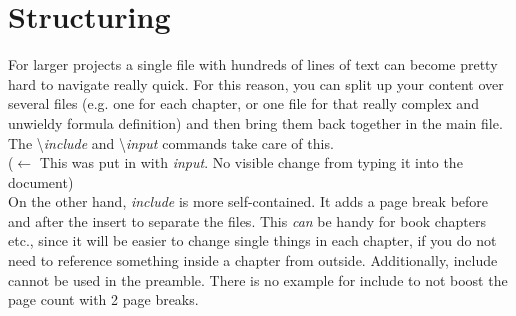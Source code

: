 \section{Structuring}
For larger projects a single file with hundreds of lines of text can become pretty hard to navigate really quick. For this reason, you can split up your content over several files (e.g. one for each chapter, or one file for that really complex and unwieldy formula definition) and then bring them back together in the main file.\\
The \textbackslash \textit{include} and \textbackslash \textit{input} commands take care of this.\\
 ($\leftarrow$ This was put in with \textit{input}. No visible change from typing it into the document)\\
On the other hand, \textit{include} is more self-contained. It adds a page break before and after the insert to separate the files. This \textit{can} be handy for book chapters etc., since it will be easier to change single things in each chapter, if you do not need to reference something inside a chapter from outside. Additionally, include cannot be used in the preamble. There is no example for include to not boost the page count with 2 page breaks.